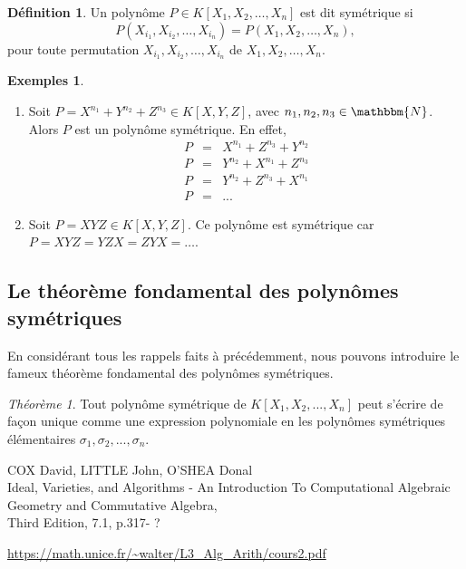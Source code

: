\documentclass[12pt]{article}
\theoremstyle{remark}\newtheorem{note}{Note}
\theoremstyle{remark}\newtheorem{nota}{Notation}
\newtheorem{theorem}{Théorème}
\theoremstyle{definition}
\newtheorem{definition}{Définition}
\newtheorem*{examples}{Exemples}
\begin{document}

\begin{definition}
Un polynôme $P \in K\left[ X_1, X_2, \ldots , X_n \right] $ est dit symétrique si $$P(X_{i_1}, X_{i_2}, \ldots , X_{i_n}) = P(X_1,X_2,\ldots ,X_n),$$ pour toute permutation $X_{i_1}, X_{i_2}, \ldots , X_{i_n}$ de $X_1,X_2, \ldots ,X_n$.
\end{definition}
\vspace{12pt}
\begin{examples}
\begin{enumerate}
	\item Soit $P = X^{n_1} + Y^{n_2} + Z^{n_3}\in K\left[ X,Y,Z\right]$, avec $n_1,n_2,n_3 \in \mathbbm{N}$. Alors $P$ est un polynôme symétrique. En effet, 
		\begin{eqnarray}
P &=& X^{n_1} + Z^{n_3} + Y^{n_2} \nonumber \\
P &=& Y^{n_2} + X^{n_1} + Z^{n_3} \nonumber \\
P &=& Y^{n_2} + Z^{n_3} + X^{n_1} \nonumber \\
P &=& ... \nonumber
		\end{eqnarray}
		
	\item Soit $P = XYZ \in K\left[ X,Y,Z\right]$. Ce polynôme est symétrique car $P = XYZ = YZX = ZYX = \ldots$.
\end{enumerate}

\end{examples}

\subsection{Le théorème fondamental des polynômes symétriques}
En considérant tous les rappels faits à précédemment, nous pouvons introduire le fameux théorème fondamental des polynômes symétriques.

\begin{theorem}
Tout polynôme symétrique de $K\left[ X_1, X_2, ... , X_n \right]$ peut s'écrire de façon unique comme une expression polynomiale en les polynômes symétriques élémentaires $\sigma_1, \sigma_2,..., \sigma_n$.
\end{theorem}







\pagebreak
{}

\begin{thebibliography}{9}
	COX David, LITTLE John, O'SHEA Donal\\
	Ideal, Varieties, and Algorithms - An Introduction To Computational Algebraic Geometry and Commutative Algebra,\\
	Third Edition,
	7.1, p.317- ?

	\url{https://math.unice.fr/~walter/L3_Alg_Arith/cours2.pdf}
	
\end{thebibliography}
\end{document}
